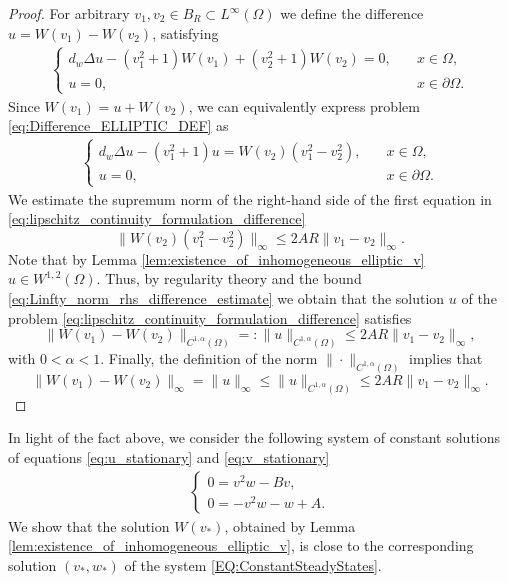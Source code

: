 \documentclass[review,onefignum,onetabnum]{SIAM-styles/siamart171218}
\begin{document}
\begin{proof}
    For arbitrary $v_1, v_2 \in B_R \subset L^\infty(\Omega)$ we define the difference $u = W(v_1) - W(v_2)$, satisfying 
    \begin{align}
        \label{eq:Difference_ELLIPTIC_DEF}
        \begin{cases}
            d_w\Delta u - (v_1^2 + 1) W(v_1) + (v_2^2 + 1) W(v_2) = 0, &\quad x \in \Omega, \\
            u = 0, &\quad x \in \partial\Omega.
        \end{cases}
    \end{align}
    Since $W(v_1) = u + W(v_2)$, we can equivalently express problem \eqref{eq:Difference_ELLIPTIC_DEF} as
    \begin{align}
        \label{eq:lipschitz_continuity_formulation_difference}
        \begin{cases}
            d_w\Delta u - (v_1^2 + 1) u  = W(v_2) (v_1^2 - v_2^2), &\quad x \in \Omega, \\
            u = 0, &\quad x \in \partial\Omega.
        \end{cases}
    \end{align}
    We estimate the supremum norm of the right-hand side of the first equation in \eqref{eq:lipschitz_continuity_formulation_difference}
    \begin{equation}
        \label{eq:Linfty_norm_rhs_difference_estimate}
        \|W(v_2) (v_1^2-v_2^2)\|_\infty \leq 2AR\|v_1-v_2\|_\infty.
    \end{equation}
    Note that by Lemma \ref{lem:existence_of_inhomogeneous_elliptic_v} $u \in W^{1,2}(\Omega)$. Thus, by regularity theory \cite[Theorems 8.33 and 8.34]{gilbarg2001elliptic} and the bound \eqref{eq:Linfty_norm_rhs_difference_estimate} we obtain that the solution $u$ of the problem \eqref{eq:lipschitz_continuity_formulation_difference} satisfies
    \begin{equation}
        \|W(v_1) - W(v_2)\|_{C^{1, \alpha}(\Omega)} =: \|u\|_{C^{1, \alpha}(\Omega)}  \leq 2AR\|v_1-v_2\|_\infty,
    \end{equation}
    with $0 < \alpha < 1$. Finally, the definition of the norm $\|\cdot\|_{C^{1,\alpha}(\Omega)}$ implies that 
    \begin{equation}
        \|W(v_1) - W(v_2)\|_\infty = \|u\|_\infty \leq \|u\|_{C^{1, \alpha}(\Omega)}  \leq 2AR\|v_1-v_2\|_\infty.
    \end{equation}
\end{proof}
In light of the fact above, we consider the following system of constant solutions of equations \eqref{eq:u_stationary} and \eqref{eq:v_stationary}
\begin{align}
    \label{EQ:ConstantSteadyStates}
    \begin{cases}
        0 = v^2w - Bv,\\
        0 = -v^2w - w + A.
    \end{cases}
\end{align}
We show that the solution $W(v_*)$, obtained by Lemma \ref{lem:existence_of_inhomogeneous_elliptic_v}, is close to the corresponding solution $(v_*, w_*)$ of the system \eqref{EQ:ConstantSteadyStates}. 
\end{document}
